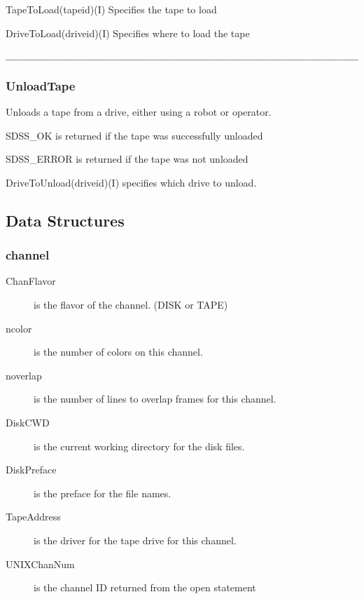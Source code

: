 \begin{arguments}
\item{TapeToLoad}(tapeid)(I) Specifies the tape to load
\item{DriveToLoad}(driveid)(I) Specifies where to load the tape
\end{arguments}
\begin{verbatim}
__________________________________________________________________________
\end{verbatim}
\subsubsection{UnloadTape}

\begin{descrip}
Unloads a tape from a drive, either using a robot or operator.
\end{descrip}

\begin{returnval}
\item{SDSS\_OK} is returned if the tape was successfully unloaded
\item{SDSS\_ERROR} is returned if the tape was not unloaded
\end{returnval}

\begin{arguments}
\item{DriveToUnload}(driveid)(I) specifies which drive to unload.
\end{arguments}


\subsection{Data Structures}

\subsubsection{channel}
\begin{description}
  \item[ChanFlavor] is the flavor of the channel. (DISK or TAPE)
  \item[ncolor] is the number of colors on this channel.
  \item[noverlap] is the number of lines to overlap frames for this channel.
  \item[DiskCWD] is the current working directory for the disk files.
  \item[DiskPreface] is the preface for the file names.
  \item[TapeAddress] is the driver for the tape drive for this channel.
  \item[UNIXChanNum] is the channel ID returned from the open statement
\end{description}


